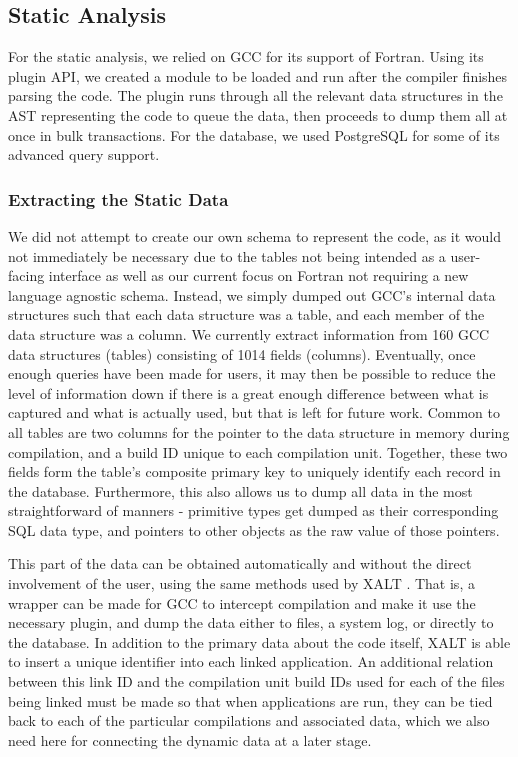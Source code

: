 \subsection{Static Analysis}
For the static analysis, we relied on \acs{GCC} for its support of Fortran.
Using its plugin \acs{API}, we created a module to be loaded and run after the compiler finishes parsing the code.
The plugin runs through all the relevant data structures in the \ac{AST} representing the code to queue the data, then proceeds to dump them all at once in bulk transactions.
For the database, we used PostgreSQL for some of its advanced query support.
\subsubsection{Extracting the Static Data}
We did not attempt to create our own schema to represent the code, as it would not immediately be necessary due to the tables not being intended as a user-facing interface as well as our current focus on Fortran not requiring a new language agnostic schema.
Instead, we simply dumped out \acs{GCC}'s internal data structures such that each data structure was a table, and each member of the data structure was a column.
We currently extract information from 160 \acs{GCC} data structures (tables) consisting of 1014 fields (columns).
Eventually, once enough queries have been made for users, it may then be possible to reduce the level of information down if there is a great enough difference between what is captured and what is actually used, but that is left for future work.
Common to all tables are two columns for the pointer to the data structure in memory during compilation, and a build ID unique to each compilation unit.
Together, these two fields form the table's composite primary key to uniquely identify each record in the database.
Furthermore, this also allows us to dump all data in the most straightforward of manners - primitive types get dumped as their corresponding \acs{SQL} data type, and pointers to other objects as the raw value of those pointers.

This part of the data can be obtained automatically and without the direct involvement of the user, using the same methods used by XALT \cite{7081224}.
That is, a wrapper can be made for \acs{GCC} to intercept compilation and make it use the necessary plugin, and dump the data either to files, a system log, or directly to the database.
In addition to the primary data about the code itself, XALT is able to insert a unique identifier into each linked application.
An additional relation between this link ID and the compilation unit build IDs used for each of the files being linked must be made so that when applications are run, they can be tied back to each of the particular compilations and associated data, which we also need here for connecting the dynamic data at a later stage.
